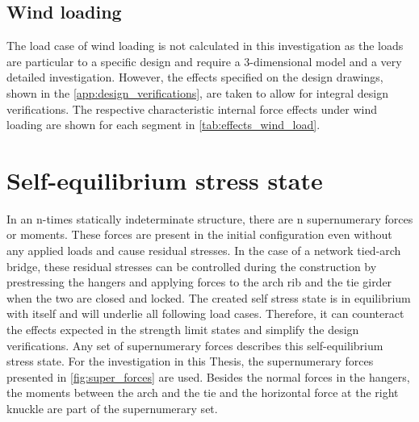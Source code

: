 \subsection{Wind loading}
The load case of wind loading is not calculated in this investigation as the loads are particular to a specific design and require a 3-dimensional model and a very detailed investigation. However, the effects specified on the design drawings, shown in the \cref{app:design_verifications}, are taken to allow for integral design verifications. The respective characteristic internal force effects under wind loading are shown for each segment in \cref{tab:effects_wind_load}.




\newpage
\section{Self-equilibrium stress state} \label{sec:met_seq}
In an n-times statically indeterminate structure, there are n supernumerary forces or moments. These forces are present in the initial configuration even without any applied loads and cause residual stresses. In the case of a network tied-arch bridge, these residual stresses can be controlled during the construction by prestressing the hangers and applying forces to the arch rib and the tie girder when the two are closed and locked. The created self stress state is in equilibrium with itself and will underlie all following load cases. Therefore, it can counteract the effects expected in the strength limit states and simplify the design verifications. Any set of supernumerary forces describes this self-equilibrium stress state. For the investigation in this Thesis, the supernumerary forces presented in \cref{fig:super_forces} are used. Besides the normal forces in the hangers, the moments between the arch and the tie and the horizontal force at the right knuckle are part of the supernumerary set.


